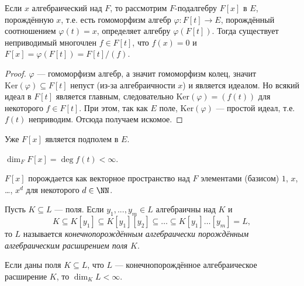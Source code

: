 \documentclass[12pt,a4paper]{article}
\newcommand{\Ker}{\mathrm{Ker}}
\begin{document}
    \begin{lemma}
        Если $x$ алгебраический над $F$, то рассмотрим $F$-подалгебру $F[x]$ в $E$, порождённую $x$, т.е. есть гомоморфизм алгебр $\varphi: F[t] \to E$, порождённый соотношением $\varphi(t) = x$, определяет алгебру $\varphi(F[t])$. Тогда существует неприводимый многочлен $f \in F[t]$, что $f(x) = 0$ и $F[x] = \varphi(F[t]) = F[t]/(f)$.
    \end{lemma}

    \begin{proof}
        $\varphi$ --- гомоморфизм алгебр, а значит гомоморфизм колец, значит $\Ker(\varphi) \subseteq F[t]$ непуст (из-за алгебраичности $x$) и является идеалом. Но всякий идеал в $F[t]$ является главным, следовательно $\Ker(\varphi) = (f(t))$ для некоторого $f \in F[t]$. При этом, так как $E$ поле, $\Ker(\varphi)$ --- простой идеал, т.е. $f(t)$ неприводим. Отсюда получаем искомое.
    \end{proof}

    \begin{corollary}
        Уже $F[x]$ является подполем в $E$.
    \end{corollary}

    \begin{corollary}\label{finitness-of-algebraic-field-corollary}
        $\dim_F F[x] = \deg f(t) < \infty$.
    \end{corollary}

    \begin{corollary}\label{finite-generation-of-F[x]-corollary}
        $F[x]$ порождается как векторное пространство над $F$ элементами (базисом) $1$, $x$, \dots, $x^d$ для некоторого $d \in \NN$.
    \end{corollary}

    \begin{definition}
        Пусть $K \subseteq L$ --- поля. Если $y_1, ..., y_m \in L$ алгебраичны над $K$ и
        \[K \subseteq K[y_1] \subseteq K[y_1][y_2] \subseteq \dots \subseteq K[y_1]\dots[y_m] = L,\]
        то $L$ называется \emph{конечнопорождённым алгебраически порождённым алгебраическим расширением поля $K$}.
    \end{definition}

    \begin{lemma}\label{finite-gerenation-of-finite-algebraic-extension-lemma}
        Если даны поля $K \subseteq L$, что $L$ --- конечнопорождённое алгебраическое расширение $K$, то $\dim_K L < \infty$.
    \end{lemma}
\end{document}
